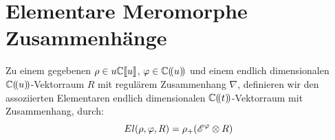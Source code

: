 \section{Elementare Meromorphe Zusammenhänge}

\begin{defn}
  \cite[Def 2.1]{sabbah_Fourier-local}
  Zu einem gegebenen $\rho\in u\mathbb{C}\llbracket u\rrbracket$,
  $\varphi\in\mathbb{C}(\!(u)\!)$ und einem endlich dimensionalen
  $\mathbb{C}(\!(u)\!)$-Vektorraum $R$ mit regulärem Zusammenhang $\nabla$,
  definieren wir den assoziierten Elementaren endlich dimensionalen
  $\mathbb{C}(\!(t)\!)$-Vektorraum mit Zusammenhang, durch:
  \[
    El(\rho,\varphi,R)=\rho_+(\mathscr{E}^\varphi\otimes R)
  \]
\end{defn}


